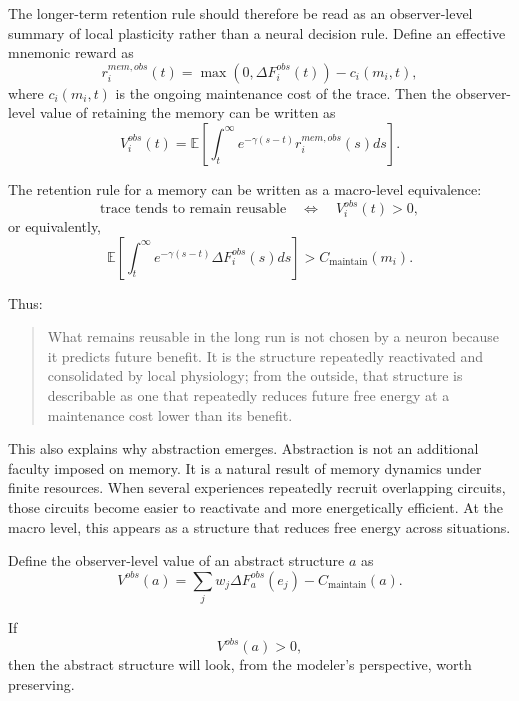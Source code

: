 \documentclass[11pt, a4paper]{article}
\begin{document}
The longer-term retention rule should therefore be read as an observer-level summary of local plasticity rather than a neural decision rule. Define an effective mnemonic reward as
\begin{equation}
r_i^{mem,obs}(t)
=
\max(0,\Delta F_i^{obs}(t))
-
c_i(m_i,t),
\end{equation}
where $c_i(m_i,t)$ is the ongoing maintenance cost of the trace. Then the observer-level value of retaining the memory can be written as
\begin{equation}
V_i^{obs}(t)
=
\mathbb{E}
\left[
\int_t^\infty
e^{-\gamma(s-t)}
r_i^{mem,obs}(s)ds
\right].
\end{equation}

The retention rule for a memory can be written as a macro-level equivalence:
\begin{equation}
\text{trace tends to remain reusable}
\quad
\Longleftrightarrow
\quad
V_i^{obs}(t)>0,
\end{equation}
or equivalently,
\begin{equation}
\mathbb{E}
\left[
\int_t^\infty
e^{-\gamma(s-t)}
\Delta F_i^{obs}(s)ds
\right]
>
C_{\text{maintain}}(m_i).
\end{equation}

Thus:
\begin{quote}
What remains reusable in the long run is not chosen by a neuron because it predicts future benefit. It is the structure repeatedly reactivated and consolidated by local physiology; from the outside, that structure is describable as one that repeatedly reduces future free energy at a maintenance cost lower than its benefit.
\end{quote}

This also explains why abstraction emerges. Abstraction is not an additional faculty imposed on memory. It is a natural result of memory dynamics under finite resources. When several experiences repeatedly recruit overlapping circuits, those circuits become easier to reactivate and more energetically efficient. At the macro level, this appears as a structure that reduces free energy across situations.

Define the observer-level value of an abstract structure $a$ as
\begin{equation}
V^{obs}(a)
=
\sum_j w_j \Delta F_a^{obs}(e_j)
-
C_{\text{maintain}}(a).
\end{equation}

If
\begin{equation}
V^{obs}(a)>0,
\end{equation}
then the abstract structure will look, from the modeler's perspective, worth preserving.
\end{document}

